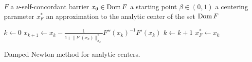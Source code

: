 \begin{algorithm}[ht]
  \begin{algorithmic}[1]
    \Require
      \Statex $F$ a $\nu$-self-concordant barrier
      \Statex $x_0 \in \operatorname{Dom} F$ a starting point
      \Statex $\beta \in (0,1)$ a centering parameter
    \Ensure
      \Statex $x^*_F$ an approximation to the analytic center of the set $\operatorname{Dom} F$
      \Statex

    \State $k \gets 0$
      \State $x_{k+1} \gets x_k - \frac{1}{1+\|F'(x_k)\|_{x_k}^*}F''(x_k)^{-1}F'(x_k)$
      \State $k \gets k + 1$
    \EndWhile
    \State \Return $x^*_F \gets x_k$

  \end{algorithmic}
  \caption{Damped Newton method for analytic centers. \cite[Scheme~4.2.25]{Nesterov-2004}}
\end{algorithm}

